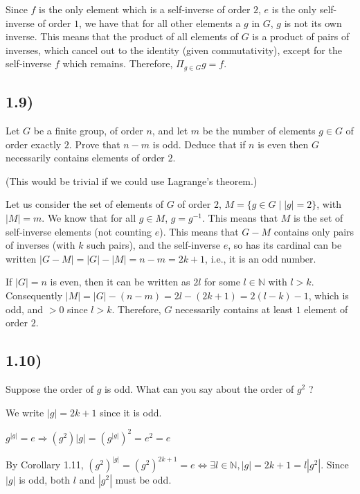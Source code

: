 Since $f$ is the only element which is a self-inverse of order $2$, $e$ is the only self-inverse of order $1$, we have that for all other elements a $g$ in $G$, $g$ is not its own inverse. This means that the product of all elements of $G$ is a product of pairs of inverses, which cancel out to the identity (given commutativity), except for the self-inverse $f$ which remains. Therefore, $\Pi_{g \in G} g = f$.



\subsection*{1.9)}

Let $G$ be a finite group, of order $n$, and let $m$ be the number of elements $g \in G$ of order exactly $2$. Prove that $n - m$ is odd. Deduce that if $n$ is even then $G$ necessarily contains elements of order $2$.

(This would be trivial if we could use Lagrange's theorem.)

Let us consider the set of elements of $G$ of order $2$, $M = \{ g \in G \mid |g| = 2 \}$, with $|M| = m$. We know that for all $g \in M$, $g = g^{-1}$. This means that $M$ is the set of self-inverse elements (not counting $e$). This means that $G - M$ contains only pairs of inverses (with $k$ such pairs), and the self-inverse $e$, so has its cardinal can be written $|G - M| = |G| - |M| = n - m = 2k + 1$, i.e., it is an odd number.

If $|G| = n$ is even, then it can be written as $2l$ for some $l \in \mathbb{N}$ with $l > k$. Consequently $|M| = |G| - (n - m) = 2l - (2k + 1) = 2(l - k) - 1$, which is odd, and $> 0$ since $l > k$. Therefore, $G$ necessarily contains at least $1$ element of order $2$.



\subsection*{1.10)}

Suppose the order of $g$ is odd. What can you say about the order of $g^2$ ?

We write $|g| = 2k + 1$ since it is odd.

$g^{|g|} = e \Rightarrow (g^2){|g|} = (g^{|g|})^2 = e^2 = e$

By Corollary 1.11, $(g^2)^{|g|} = (g^2)^{2k + 1} = e \Leftrightarrow \exists l \in \mathbb{N}, |g| = 2k + 1 = l|g^2|$. Since $|g|$ is odd, both $l$ and $|g^2|$ must be odd.



